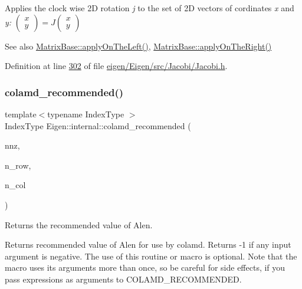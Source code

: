 Applies the clock wise 2D rotation {\itshape j} to the set of 2D vectors of cordinates {\itshape x} and {\itshape y\+:} $ \left ( \begin{array}{cc} x \\ y \end{array} \right ) = J \left ( \begin{array}{cc} x \\ y \end{array} \right ) $

\begin{DoxySeeAlso}{See also}
\hyperlink{group___core___module_a3a08ad41e81d8ad4a37b5d5c7490e765}{Matrix\+Base\+::apply\+On\+The\+Left()}, \hyperlink{group___core___module_a45d91752925d2757fc8058a293b15462}{Matrix\+Base\+::apply\+On\+The\+Right()} 
\end{DoxySeeAlso}


Definition at line \hyperlink{eigen_2_eigen_2src_2_jacobi_2_jacobi_8h_source_l00302}{302} of file \hyperlink{eigen_2_eigen_2src_2_jacobi_2_jacobi_8h_source}{eigen/\+Eigen/src/\+Jacobi/\+Jacobi.\+h}.

\mbox{\label{namespace_eigen_1_1internal_a182742cb4291838dfc4cd1e5b2b95c65}} 
\subsubsection{\texorpdfstring{colamd\+\_\+recommended()}{colamd\_recommended()}}
{\footnotesize\ttfamily template$<$typename Index\+Type $>$ \\
Index\+Type Eigen\+::internal\+::colamd\+\_\+recommended (\begin{DoxyParamCaption}\item[{Index\+Type}]{nnz,  }\item[{Index\+Type}]{n\+\_\+row,  }\item[{Index\+Type}]{n\+\_\+col }\end{DoxyParamCaption})\hspace{0.3cm}{\ttfamily [inline]}}



Returns the recommended value of Alen. 

Returns recommended value of Alen for use by colamd. Returns -\/1 if any input argument is negative. The use of this routine or macro is optional. Note that the macro uses its arguments more than once, so be careful for side effects, if you pass expressions as arguments to C\+O\+L\+A\+M\+D\+\_\+\+R\+E\+C\+O\+M\+M\+E\+N\+D\+ED.


